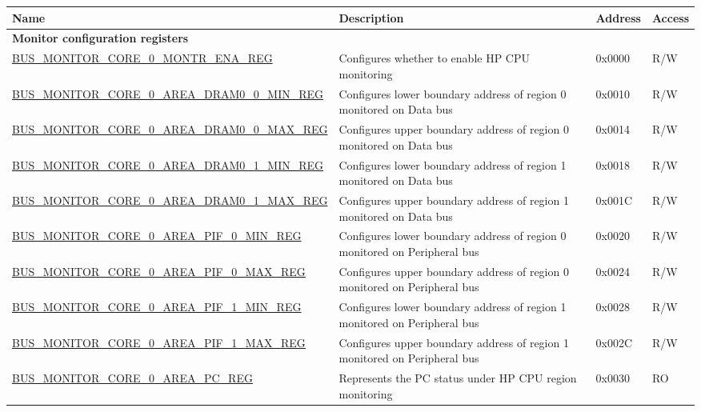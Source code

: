 \begin{longtable}{ |p{9.5cm} | p{11.6cm}| l | l | }
\hline\rowcolor{lightgray}
{\bfseries Name} & {\bfseries Description} &  {\bfseries Address} & {\bfseries Access} \\ \hline
\endhead
\multicolumn{4}{|l|}{\textbf{Monitor configuration registers}} \\ \hline
\hyperref[regdesc:BUSMONITORCORE0MONTRENAREG]{BUS\_MONITOR\_CORE\_0\_MONTR\_ENA\_REG} & Configures whether to enable HP CPU monitoring & 0x0000 & R/W \\ \hline
\hyperref[regdesc:BUSMONITORCORE0AREADRAM00MINREG]{BUS\_MONITOR\_CORE\_0\_AREA\_DRAM0\_0\_MIN\_REG} & Configures lower boundary address of region 0 monitored on Data bus & 0x0010 & R/W \\ \hline
\hyperref[regdesc:BUSMONITORCORE0AREADRAM00MAXREG]{BUS\_MONITOR\_CORE\_0\_AREA\_DRAM0\_0\_MAX\_REG} & Configures upper boundary address of region 0 monitored on Data bus & 0x0014 & R/W \\ \hline
\hyperref[regdesc:BUSMONITORCORE0AREADRAM01MINREG]{BUS\_MONITOR\_CORE\_0\_AREA\_DRAM0\_1\_MIN\_REG} & Configures lower boundary address of region 1 monitored on Data bus & 0x0018 & R/W \\ \hline
\hyperref[regdesc:BUSMONITORCORE0AREADRAM01MAXREG]{BUS\_MONITOR\_CORE\_0\_AREA\_DRAM0\_1\_MAX\_REG} & Configures upper boundary address of region 1 monitored on Data bus & 0x001C & R/W \\ \hline
\hyperref[regdesc:BUSMONITORCORE0AREAPIF0MINREG]{BUS\_MONITOR\_CORE\_0\_AREA\_PIF\_0\_MIN\_REG} & Configures lower boundary address of region 0 monitored on Peripheral bus & 0x0020 & R/W \\ \hline
\hyperref[regdesc:BUSMONITORCORE0AREAPIF0MAXREG]{BUS\_MONITOR\_CORE\_0\_AREA\_PIF\_0\_MAX\_REG} & Configures upper boundary address of region 0 monitored on Peripheral bus & 0x0024 & R/W \\ \hline
\hyperref[regdesc:BUSMONITORCORE0AREAPIF1MINREG]{BUS\_MONITOR\_CORE\_0\_AREA\_PIF\_1\_MIN\_REG} & Configures lower boundary address of region 1 monitored on Peripheral bus & 0x0028 & R/W \\ \hline
\hyperref[regdesc:BUSMONITORCORE0AREAPIF1MAXREG]{BUS\_MONITOR\_CORE\_0\_AREA\_PIF\_1\_MAX\_REG} & Configures upper boundary address of region 1 monitored on Peripheral bus & 0x002C & R/W \\ \hline
\hyperref[regdesc:BUSMONITORCORE0AREAPCREG]{BUS\_MONITOR\_CORE\_0\_AREA\_PC\_REG} & Represents the PC status under HP CPU region monitoring & 0x0030 & RO \\ \hline

\end{longtable}
